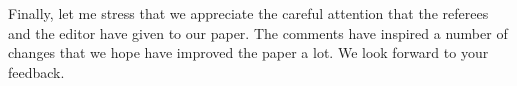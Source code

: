 \documentclass[11pt]{article}
\begin{document}
Finally, let me stress that we appreciate the careful attention that the referees and the editor have given to our paper.  The comments have inspired a number of changes that we hope have improved the paper a lot.  We look forward to your feedback.



\end{document}

